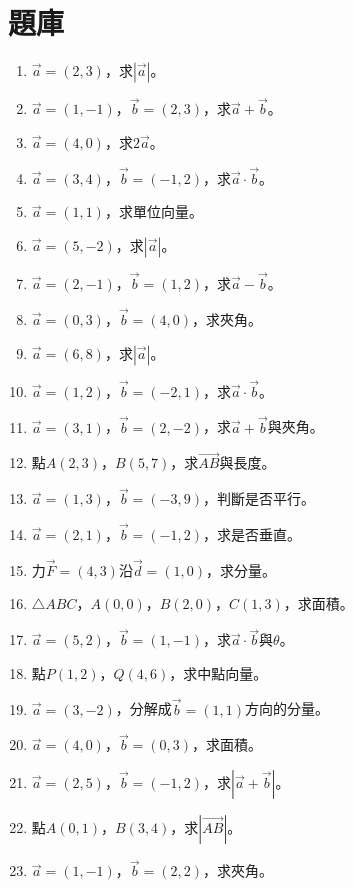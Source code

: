 \section{題庫}
\begin{enumerate}[label=\arabic*.]
    \item $\vec{a} = (2, 3)$，求$|\vec{a}|$。
    \item $\vec{a} = (1, -1)$，$\vec{b} = (2, 3)$，求$\vec{a} + \vec{b}$。
    \item $\vec{a} = (4, 0)$，求$2\vec{a}$。
    \item $\vec{a} = (3, 4)$，$\vec{b} = (-1, 2)$，求$\vec{a} \cdot \vec{b}$。
    \item $\vec{a} = (1, 1)$，求單位向量。
    \item $\vec{a} = (5, -2)$，求$|\vec{a}|$。
    \item $\vec{a} = (2, -1)$，$\vec{b} = (1, 2)$，求$\vec{a} - \vec{b}$。
    \item $\vec{a} = (0, 3)$，$\vec{b} = (4, 0)$，求夾角。
    \item $\vec{a} = (6, 8)$，求$|\vec{a}|$。
    \item $\vec{a} = (1, 2)$，$\vec{b} = (-2, 1)$，求$\vec{a} \cdot \vec{b}$。
    \item $\vec{a} = (3, 1)$，$\vec{b} = (2, -2)$，求$\vec{a} + \vec{b}$與夾角。
    \item 點$A(2, 3)$，$B(5, 7)$，求$\vec{AB}$與長度。
    \item $\vec{a} = (1, 3)$，$\vec{b} = (-3, 9)$，判斷是否平行。
    \item $\vec{a} = (2, 1)$，$\vec{b} = (-1, 2)$，求是否垂直。
    \item 力$\vec{F} = (4, 3)$沿$\vec{d} = (1, 0)$，求分量。
    \item $\triangle ABC$，$A(0, 0)$，$B(2, 0)$，$C(1, 3)$，求面積。
    \item $\vec{a} = (5, 2)$，$\vec{b} = (1, -1)$，求$\vec{a} \cdot \vec{b}$與$\theta$。
    \item 點$P(1, 2)$，$Q(4, 6)$，求中點向量。
    \item $\vec{a} = (3, -2)$，分解成$\vec{b} = (1, 1)$方向的分量。
    \item $\vec{a} = (4, 0)$，$\vec{b} = (0, 3)$，求面積。
    \item $\vec{a} = (2, 5)$，$\vec{b} = (-1, 2)$，求$|\vec{a} + \vec{b}|$。
    \item 點$A(0, 1)$，$B(3, 4)$，求$|\vec{AB}|$。
    \item $\vec{a} = (1, -1)$，$\vec{b} = (2, 2)$，求夾角。

\end{enumerate}
